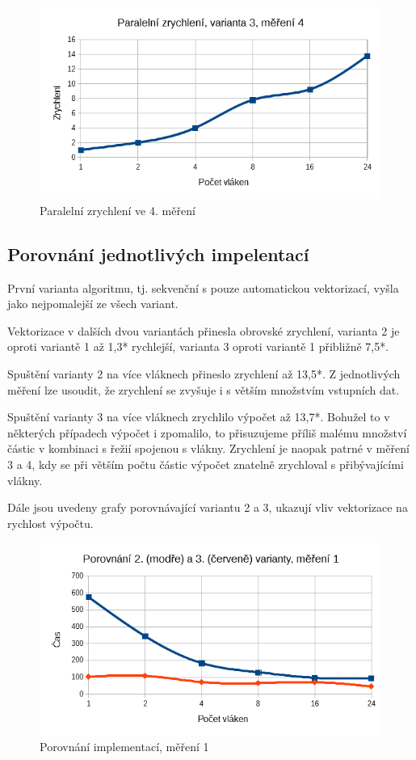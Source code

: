 \documentclass[12pt]{article}
\begin{document}
\begin{figure}[H]
  \begin{center}
     \includegraphics[width=12cm]{images/ssef4acc.png}
    \caption{Paralelní zrychlení ve 4. měření} 
  \end{center}
\end{figure}

\subsection{Porovnání jednotlivých impelentací}
První varianta algoritmu, tj. sekvenční s pouze automatickou vektorizací, vyšla jako nejpomalejší ze všech variant.

Vektorizace v dalších dvou variantách přinesla obrovské zrychlení, varianta 2 je oproti variantě 1 až 1,3* rychlejší, varianta 3 oproti variantě 1 přibližně 7,5*.

Spuštění varianty 2 na více vláknech přineslo zrychlení až 13,5*. Z jednotlivých měření lze usoudit, že zrychlení se zvyšuje i s větším množstvím vstupních dat.

Spuštění varianty 3 na více vláknech zrychlilo výpočet až 13,7*.
Bohužel to v některých případech výpočet i zpomalilo, to přisuzujeme příliš malému množství částic v kombinaci s řežií spojenou s vlákny.
Zrychlení je naopak patrné v měření 3 a 4, kdy se při větším počtu částic výpočet znatelně zrychloval s přibývajícími vlákny.

Dále jsou uvedeny grafy porovnávající variantu 2 a 3, ukazují vliv vektorizace na rychlost výpočtu.

\begin{figure}
  \begin{center}
      \includegraphics[width=12cm]{images/vs1.png}	
    \caption{Porovnání implementací, měření 1} 
  \end{center}
\end{figure}
\end{document}
